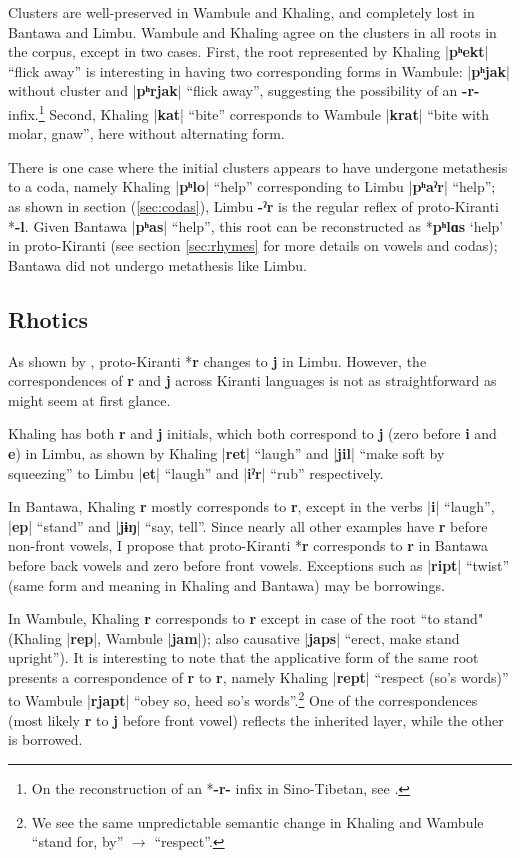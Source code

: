 \documentclass[oldfontcommands,oneside,a4paper,11pt]{article}
\newcommand{\ipa}[1]{\textbf{{\phon\mbox{#1}}}} %
\newcommand{\dhatu}[2]{|\ipa{#1}| ``#2''}
\begin{document}
Clusters are well-preserved in Wambule and Khaling, and completely lost in Bantawa and Limbu. Wambule and Khaling  agree on the clusters in all roots in the corpus, except in two cases. First, the root represented by Khaling \dhatu{pʰekt}{flick away} is interesting in having two corresponding forms in Wambule: |\ipa{pʰjak}| without cluster and \dhatu{pʰrjak}{flick away}, suggesting the possibility of an \ipa{-r-} infix.\footnote{On the reconstruction of an *\ipa{-r-} infix in Sino-Tibetan, see \citet[111-120]{sagart99roc}.} Second, Khaling \dhatu{kat}{bite} corresponds to Wambule  \dhatu{krat}{bite with molar, gnaw}, here without alternating form.

There is one case where the initial clusters appears to have undergone metathesis to a coda, namely Khaling \dhatu{pʰlo}{help} corresponding to Limbu \dhatu{pʰaˀr}{help}; as shown in section (\ref{sec:codas}), Limbu \ipa{-ˀr} is the regular reflex of proto-Kiranti *\ipa{-l}. Given Bantawa \dhatu{pʰas}{help}, this root can be reconstructed as *\ipa{pʰlɑs} `help' in proto-Kiranti (see section \ref{sec:rhymes} for more details on vowels and codas); Bantawa did not undergo metathesis like Limbu.
 
\subsection{Rhotics} 
As shown by  \citet{driem90r}, proto-Kiranti *\ipa{r} changes to \ipa{j} in Limbu. However, the correspondences of \ipa{r} and \ipa{j} across Kiranti languages is not as straightforward as might seem at first glance.

Khaling has both \ipa{r} and \ipa{j} initials, which both correspond to \ipa{j} (zero before \ipa{i} and \ipa{e}) in Limbu, as shown by Khaling \dhatu{ret}{laugh} and  \dhatu{jil}{make soft by squeezing} to Limbu \dhatu{et}{laugh} and \dhatu{iˀr}{rub} respectively.

In Bantawa, Khaling \ipa{r} mostly corresponds to \ipa{r}, except in the verbs \dhatu{i}{laugh}, \dhatu{ep}{stand} and \dhatu{jɨŋ}{say, tell}. Since nearly all other examples have \ipa{r} before non-front vowels, I propose that proto-Kiranti *\ipa{r} corresponds to \ipa{r} in Bantawa before back vowels and zero before front vowels. Exceptions such as \dhatu{ript}{twist} (same form and meaning in Khaling and Bantawa) may be borrowings.

In Wambule, Khaling \ipa{r} corresponds to \ipa{r} except in case of the root ``to stand" (Khaling |\ipa{rep}|, Wambule  |\ipa{jam}|); also causative \dhatu{japs}{erect, make stand upright}). It is interesting to note that the applicative form of the same root presents a correspondence of \ipa{r} to \ipa{r}, namely Khaling \dhatu{rept}{respect (so's words)} to Wambule \dhatu{rjapt}{obey so, heed so's words}.\footnote{We see the same unpredictable semantic change in Khaling and Wambule ``stand for, by'' $\rightarrow$ ``respect''.} One of the correspondences (most likely \ipa{r} to \ipa{j} before front vowel) reflects the inherited layer, while the other is borrowed.  
\end{document}
